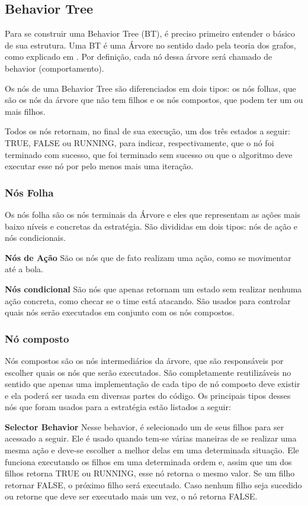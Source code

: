 \documentclass[conference]{IEEEtran}
\begin{document}
\subsection{Behavior Tree}

Para se construir uma Behavior Tree (BT), é preciso primeiro entender o básico de sua estrutura. Uma BT é uma Árvore no sentido dado pela teoria dos grafos, como explicado em \cite{west2001introduction}. Por definição, cada nó dessa árvore será chamado de behavior (comportamento).

Os nós de uma Behavior Tree são diferenciados em dois tipos: os nós folhas, que são os nós da árvore que não tem filhos e os nós compostos, que podem ter um ou mais filhos.

Todos os nós retornam, no final de sua execução, um dos três estados a seguir: TRUE, FALSE ou RUNNING, para indicar, respectivamente, que o nó foi terminado com sucesso, que foi terminado sem sucesso ou que o algoritmo deve executar esse nó por pelo menos mais uma iteração.

\subsubsection{Nós Folha}

Os nós folha são os nós terminais da Árvore e eles que representam as ações mais baixo níveis e concretas da estratégia. São divididas em dois tipos: nós de ação e nós condicionais.

\textbf{Nós de Ação} São os nós que de fato realizam uma ação, como se movimentar até a bola.

\textbf{Nós condicional} São nós que apenas retornam um estado sem realizar nenhuma ação concreta, como checar se o time está atacando. São usados para controlar quais nós serão executados em conjunto com os nós compostos.

\subsubsection{Nó composto}

Nós compostos são os nós intermediários da árvore, que  são responsáveis por escolher quais os nós que serão executados. São completamente reutilizáveis no sentido que apenas uma implementação de cada tipo de nó composto deve existir e ela poderá ser usada em diversas partes do código. Os principais tipos desses nós que foram usados para a estratégia estão listados a seguir:

\textbf{Selector Behavior} Nesse behavior, é selecionado um de seus filhos para ser acessado a seguir. Ele é usado quando tem-se várias maneiras de se realizar uma mesma ação e deve-se escolher a melhor delas em uma determinada situação. Ele funciona executando os filhos em uma determinada ordem e, assim que um dos filhos retorna TRUE ou RUNNING, esse nó retorna o mesmo valor. Se um filho retornar FALSE, o próximo filho será executado. Caso nenhum filho seja sucedido ou retorne que deve ser executado mais um vez, o nó retorna FALSE.
\end{document}
